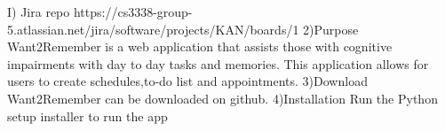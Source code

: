 I) Jira repo
https://cs3338-group-5.atlassian.net/jira/software/projects/KAN/boards/1
2)Purpose
Want2Remember is a web application that assists those with cognitive impairments with day to day tasks and memories. This application allows for users to create schedules,to-do list and appointments.
3)Download
Want2Remember can be downloaded on github.
4)Installation
Run the Python setup installer to run the app
